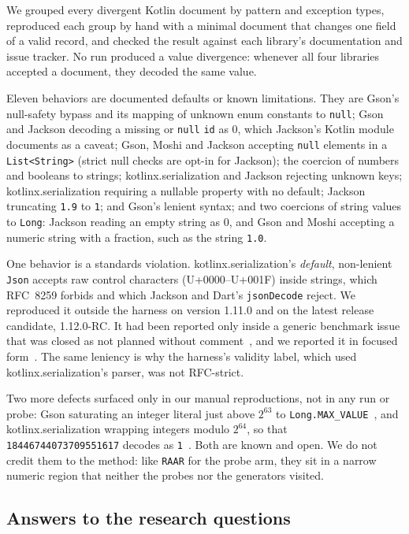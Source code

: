 We grouped every divergent Kotlin document by pattern and exception types,
reproduced each group by hand with a minimal document that changes one
field of a valid record, and checked the result against each library's
documentation and issue tracker. No run produced a value divergence:
whenever all four libraries accepted a document, they decoded the same
value.

Eleven behaviors are documented defaults or known limitations. They are
Gson's null-safety bypass and its mapping of unknown enum constants to
\texttt{null}; Gson and Jackson decoding a missing or \texttt{null}
\texttt{id} as 0, which Jackson's Kotlin module documents as a caveat;
Gson, Moshi and Jackson accepting \texttt{null} elements in a
\texttt{List<String>} (strict null checks are opt-in for Jackson); the coercion
of numbers and booleans to strings; kotlinx.serialization and Jackson rejecting
unknown keys; kotlinx.serialization requiring a nullable property with no
default; Jackson truncating \texttt{1.9} to \texttt{1}; and Gson's lenient
syntax; and two coercions of string values to \texttt{Long}: Jackson reading
an empty string as 0, and Gson and Moshi accepting a numeric string with a
fraction, such as the string \texttt{1.0}.

One behavior is a standards violation. kotlinx.serialization's
\emph{default}, non-lenient \texttt{Json} accepts raw control characters
(U+0000--U+001F) inside strings, which RFC~8259 forbids and which Jackson
and Dart's \texttt{jsonDecode} reject. We reproduced it outside the harness
on version 1.11.0 and on the latest release candidate, 1.12.0-RC. It had
been reported only inside a generic benchmark issue that was closed as not
planned without comment~\cite{kotlinxissue3273}, and we reported it in
focused form~\ctrlreport. The same leniency is why the harness's validity label,
which used kotlinx.serialization's parser, was not RFC-strict.

Two more defects surfaced only in our manual reproductions, not in any run
or probe: Gson saturating an integer literal just above $2^{63}$ to
\texttt{Long.MAX\_VALUE}~\cite{gsonissue1727}, and kotlinx.serialization
wrapping integers modulo $2^{64}$, so that \texttt{18446744073709551617}
decodes as \texttt{1}~\cite{kotlinxissue3267}. Both are known and open. We
do not credit them to the method: like \texttt{RAAR} for the probe arm,
they sit in a narrow numeric region that neither the probes nor the
generators visited.

\subsection{Answers to the research questions}

